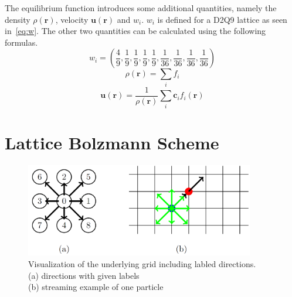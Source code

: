 The equilibrium function introduces some additional quantities, namely the density \(\rho(\mathbf{r})\), velocity \(\mathbf{u}(\mathbf{r})\) and \(w_i\).
\(w_i\) is defined for a D2Q9 lattice as seen in~\cref{eq:w}.
The other two quantities can be calculated using the following formulas.
\begin{equation}
    w_i = \left(\dfrac{4}{9},
    \dfrac{1}{9}, \dfrac{1}{9}, \dfrac{1}{9}, \dfrac{1}{9},
    \dfrac{1}{36}, \dfrac{1}{36}, \dfrac{1}{36}, \dfrac{1}{36}\right)
    \label{eq:w}
\end{equation}
\begin{equation}
    \rho(\mathbf{r})=\sum_i f_i
    \label{eq:rho}
\end{equation}
\begin{equation}
    \mathbf{u}(\mathbf{r})=
    \frac{1}{\rho(\mathbf{r})}\sum_i \mathbf{c}_i f_i(\mathbf{r})
    \label{eq:u}
\end{equation}


\section{Lattice Bolzmann Scheme}

\begin{figure}[h!]
    \begin{center}
        \includegraphics[width=10cm]{logos/Gitter_LBM.png}
        \caption[Visualization of the underlying grid including labled directions.]{
            Visualization of the underlying grid including labled directions. \\
            (a) directions with given labels \\
            (b) streaming example of one particle
        }
        \label{fig:bte}
    \end{center}
\end{figure}